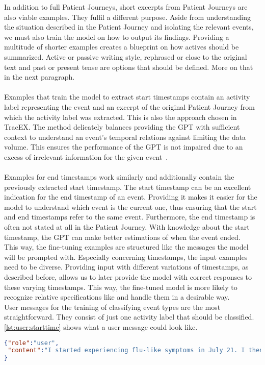 In addition to full Patient Journeys, short excerpts from Patient Journeys are also viable examples. They fulfil a different purpose. Aside from understanding the situation described in the Patient Journey and isolating the relevant events, we must also train the model on how to output its findings. Providing a multitude of shorter examples creates a blueprint on how actives should be summarized. Active or passive writing style, rephrased or close to the original text and past or present tense are options that should be defined. More on that in the next paragraph.\\\\
Examples that train the model to extract start timestamps contain an activity label representing the event and an excerpt of the original Patient Journey from which the activity label was extracted. This is also the approach chosen in TracEX. The method delicately balances providing the GPT with sufficient context to understand an event's temporal relations against limiting the data volume. This ensures the performance of the GPT is not impaired due to an excess of irrelevant information for the given event~\cite{han_is_2023}.\\\\
Examples for end timestamps work similarly and additionally contain the previously extracted start timestamp. The start timestamp can be an excellent indication for the end timestamp of an event. Providing it makes it easier for the model to understand which event is the current one, thus ensuring that the start and end timestamps refer to the same event. Furthermore, the end timestamp is often not stated at all in the Patient Journey. With knowledge about the start timestamp, the GPT can make better estimations of when the event ended.\\
This way, the fine-tuning examples are structured like the messages the model will be prompted with. Especially concerning timestamps, the input examples need to be diverse. Providing input with different variations of timestamps, as described before, allows us to later provide the model with correct responses to these varying timestamps. This way, the fine-tuned model is more likely to recognize relative specifications like  and handle them in a desirable way. \\
User messages for the training of classifying event types are the most straightforward. They consist of just one activity label that should be classified.\\
\autoref{lst:user:starttime} shows what a user message could look like.
\begin{lstlisting}[language=json, caption={User message for determining an activities start timestamp}, label={lst:user:starttime}]
{"role":"user",
 "content":"I started experiencing flu-like symptoms in July 21. I then got tested positive for Covid19. In October, I got infected again. Then on the 4th of November I got my first dosage of the vaccine. I had heavy side effects.\n Activity Label: starting to experience symptoms"
}
\end{lstlisting}

